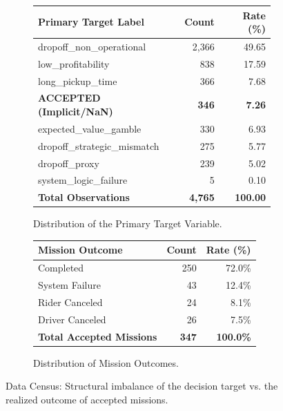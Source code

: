 \begin{figure}[H]
    \centering
    \begin{subfigure}[b]{0.48\textwidth}
        \centering
        \small
        \begin{tabularx}{\textwidth}{l r r}
            \toprule
            \textbf{Primary Target Label} & \textbf{Count} & \textbf{Rate (\%)} \\
            \midrule
            dropoff\_non\_operational & 2,366 & 49.65 \\
            low\_profitability & 838 & 17.59 \\
            long\_pickup\_time & 366 & 7.68 \\
            \textbf{ACCEPTED (Implicit/NaN)} & \textbf{346} & \textbf{7.26} \\
            expected\_value\_gamble & 330 & 6.93 \\
            dropoff\_strategic\_mismatch & 275 & 5.77 \\
            dropoff\_proxy & 239 & 5.02 \\
            system\_logic\_failure & 5 & 0.10 \\
            \midrule
            \textbf{Total Observations} & \textbf{4,765} & \textbf{100.00} \\
            \bottomrule
        \end{tabularx}
        \caption{Distribution of the Primary Target Variable.}
        \label{tab:rejection_distribution}
    \end{subfigure}
    \hfill %
    \begin{subfigure}[b]{0.48\textwidth}
        \centering
        \small
        \begin{tabularx}{\textwidth}{l r r}
            \toprule
            \textbf{Mission Outcome} & \textbf{Count} & \textbf{Rate (\%)} \\
            \midrule
            Completed & 250 & 72.0\% \\
            System Failure & 43 & 12.4\% \\
            Rider Canceled & 24 & 8.1\% \\ %
            Driver Canceled & 26 & 7.5\% \\
            \midrule
            \textbf{Total Accepted Missions} & \textbf{347} & \textbf{100.0\%} \\
            \bottomrule
        \end{tabularx}
        \caption{Distribution of Mission Outcomes.}
        \label{tab:mission_outcomes}
    \end{subfigure}
    \caption{Data Census: Structural imbalance of the decision target vs. the realized outcome of accepted missions.}
    \label{fig:data_census_merged}
\end{figure}

